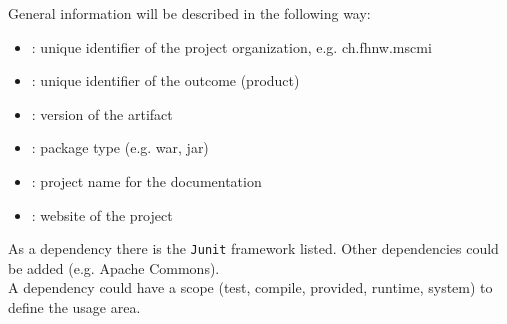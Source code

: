 General information will be described in the following way:
\begin{itemize}
\item {}: unique identifier of the project organization, e.g. ch.fhnw.mscmi
\item {}: unique identifier of the outcome (product)
\item {}: version of the artifact
\item {}: package type (e.g. war, jar)
\item {}: project name for the documentation
\item {}: website of the project
\end{itemize}
As a dependency there is the \verb|Junit| framework listed. Other
dependencies could be added (e.g. Apache Commons).\\
A dependency could have a scope (test, compile, provided, runtime, system) to
define the usage area.
%
%
\newslide

